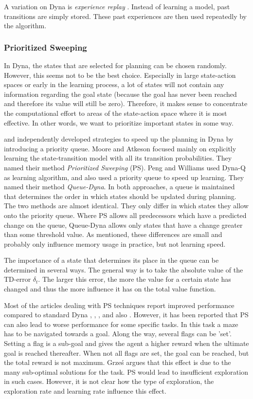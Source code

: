 \documentclass[a4paper,11pt]{mscLiterature}
\begin{document}
	A variation on Dyna is \emph{experience replay} \cite{Lin:92}. Instead of learning a model, past transitions are simply stored. These past experiences are then used repeatedly by the algorithm.
	
	\subsubsection{Prioritized Sweeping}
	In Dyna, the states that are selected for planning can be chosen randomly. However, this seems not to be the best choice. Especially in large state-action spaces or early in the learning process, a lot of states will not contain any information regarding the goal state (because the goal has never been reached and therefore its value will still be zero). Therefore, it makes sense to concentrate the computational effort to areas of the state-action space where it is most effective. In other words, we want to prioritize important states in some way. 
	
	\cite{MooreAtkeson:93} and \cite{PengWilliams:93} independently developed strategies to speed up the planning in Dyna by introducing a priority queue. Moore and Atkeson focused mainly on explicitly learning the state-transition model with all its transition probabilities. They named their method \emph{Prioritized Sweeping} (PS). Peng and Williams used Dyna-Q as learning algorithm, and also used a priority queue to speed up learning. They named their method \emph{Queue-Dyna}. In both approaches, a queue is maintained that determines the order in which states should be updated during planning. The two methods are almost identical. They only differ in which states they allow onto the priority queue. Where PS allows all predecessors which have a predicted change on the queue, Queue-Dyna allows only states that have a change greater than some threshold value. As mentioned, these differences are small and probably only influence memory usage in practice, but not learning speed. 
	
	The importance of a state that determines its place in the queue can be determined in several ways. The general way is to take the absolute value of the TD-error $\delta_t$. The larger this error, the more the value for a certain state has changed and thus the more influence it has on the total value function. 
	
	Most of the articles dealing with PS techniques report improved performance compared to standard Dyna \cite{MooreAtkeson:93}, \cite{PengWilliams:93}, \cite{Rayner:07}, and also \cite{Wingate:05}. However, it has been reported \cite{Grzes:08} that PS can also lead to worse performance for some specific tasks. In this task a maze has to be navigated towards a goal. Along the way, several flags can be 'set'. Setting a flag is a sub-goal and gives the agent a higher reward when the ultimate goal is reached thereafter. When not all flags are set, the goal can be reached, but the total reward is not maximum. Grze\'{s} argues that this effect is due to the many sub-optimal solutions for the task. PS would lead to insufficient exploration in such cases. However, it is not clear how the type of exploration, the exploration rate and learning rate influence this effect. 
	
\end{document}

